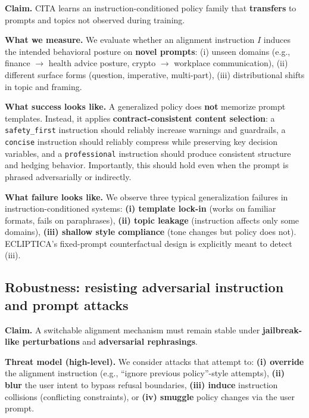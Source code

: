 \noindent
\textbf{Claim.} \textsc{CITA} learns an instruction-conditioned policy family that \textbf{transfers} to prompts and topics not observed during training.

\vspace{-0.15em}
\noindent
\textbf{What we measure.}
We evaluate whether an alignment instruction $I$ induces the intended behavioral posture on \textbf{novel prompts}:
(i) unseen domains (e.g., finance $\rightarrow$ health advice posture, crypto $\rightarrow$ workplace communication),
(ii) different surface forms (question, imperative, multi-part),
(iii) distributional shifts in topic and framing.

\vspace{-0.15em}
\noindent
\textbf{What success looks like.}
A generalized policy does \textbf{not} memorize prompt templates.
Instead, it applies \textbf{contract-consistent content selection}:
a \texttt{safety\_first} instruction should reliably increase warnings and guardrails,
a \texttt{concise} instruction should reliably compress while preserving key decision variables,
and a \texttt{professional} instruction should produce consistent structure and hedging behavior.
Importantly, this should hold even when the prompt is phrased adversarially or indirectly.

\vspace{-0.15em}
\noindent
\textbf{What failure looks like.}
We observe three typical generalization failures in instruction-conditioned systems:
\textbf{(i) template lock-in} (works on familiar formats, fails on paraphrases),
\textbf{(ii) topic leakage} (instruction affects only some domains),
\textbf{(iii) shallow style compliance} (tone changes but policy does not).
ECLIPTICA’s fixed-prompt counterfactual design is explicitly meant to detect (iii).

\vspace{-0.25em}
\subsection*{Robustness: resisting adversarial instruction and prompt attacks}
\vspace{-0.15em}

\noindent
\textbf{Claim.} A switchable alignment mechanism must remain stable under \textbf{jailbreak-like perturbations} and \textbf{adversarial rephrasings}.

\vspace{-0.15em}
\noindent
\textbf{Threat model (high-level).}
We consider attacks that attempt to:
\textbf{(i) override} the alignment instruction (e.g., ``ignore previous policy''-style attempts),
\textbf{(ii) blur} the user intent to bypass refusal boundaries,
\textbf{(iii) induce} instruction collisions (conflicting constraints),
or \textbf{(iv) smuggle} policy changes via the user prompt.

